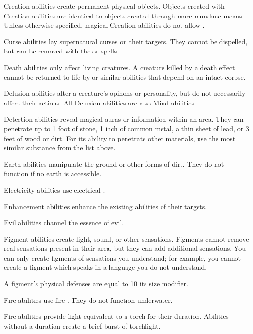      Creation abilities create permanent physical objects.
    Objects created with Creation abilities are identical to objects created through more mundane means.
    Unless otherwise specified, magical Creation abilities do not allow . 

     Curse abilities lay supernatural curses on their targets.
    They cannot be dispelled, but can be removed with the  or  spells.

     Death abilities only affect living creatures.
    A creature killed by a death effect cannot be returned to life by  or similar abilities that depend on an intact corpse.

     Delusion abilities alter a creature's opinons or personality, but do not necessarily affect their actions.
    All Delusion abilities are also Mind abilities.

     Detection abilities reveal magical auras or information within an area.
    They can penetrate up to 1 foot of stone, 1 inch of common metal, a thin sheet of lead, or 3 feet of wood or dirt.
    For its ability to penetrate other materials, use the most similar substance from the list above.

     Earth abilities manipulate the ground or other forms of dirt.
    They do not function if no earth is accessible.

     Electricity abilities use electrical .

     Enhancement abilities enhance the existing abilities of their targets.

     Evil abilities channel the essence of evil.

     Figment abilities create light, sound, or other sensations.
    Figments cannot remove real sensations present in their area, but they can add additional sensations.
    You can only create figments of sensations you understand; for example, you cannot create a figment which speaks in a language you do not understand.
    \par A figment's physical defenses are equal to 10 \add its size modifier.

     Fire abilities use fire . They do not function underwater.
    \par Fire abilities provide light equivalent to a torch for their duration.
    Abilities without a duration create a brief burst of torchlight.


